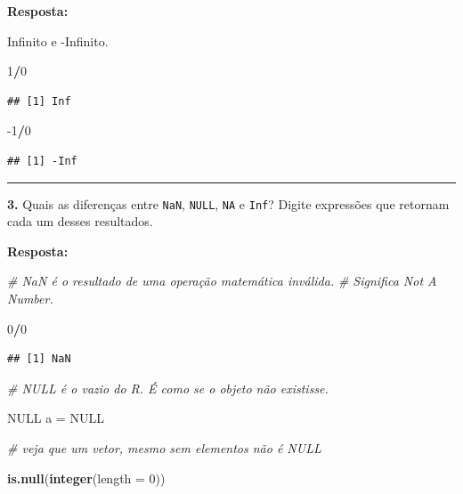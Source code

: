 \documentclass[
]{book}
\newenvironment{Shaded}{\begin{snugshade}}{\end{snugshade}}
\newcommand{\CommentTok}[1]{\textcolor[rgb]{0.56,0.35,0.01}{\textit{#1}}}
\newcommand{\DataTypeTok}[1]{\textcolor[rgb]{0.13,0.29,0.53}{#1}}
\newcommand{\DecValTok}[1]{\textcolor[rgb]{0.00,0.00,0.81}{#1}}
\newcommand{\KeywordTok}[1]{\textcolor[rgb]{0.13,0.29,0.53}{\textbf{#1}}}
\newcommand{\NormalTok}[1]{#1}
\newcommand{\OperatorTok}[1]{\textcolor[rgb]{0.81,0.36,0.00}{\textbf{#1}}}
\newcommand{\OtherTok}[1]{\textcolor[rgb]{0.56,0.35,0.01}{#1}}
\newcommand{\StringTok}[1]{\textcolor[rgb]{0.31,0.60,0.02}{#1}}
\begin{document}
\textbf{Resposta:}

Infinito e -Infinito.

\begin{Shaded}
\begin{Highlighting}[]
\DecValTok{1}\OperatorTok{/}\DecValTok{0}
\end{Highlighting}
\end{Shaded}

\begin{verbatim}
## [1] Inf
\end{verbatim}

\begin{Shaded}
\begin{Highlighting}[]
\DecValTok{{-}1}\OperatorTok{/}\DecValTok{0}
\end{Highlighting}
\end{Shaded}

\begin{verbatim}
## [1] -Inf
\end{verbatim}

\begin{center}\rule{0.5\linewidth}{0.5pt}\end{center}

\textbf{3.} Quais as diferenças entre \texttt{NaN}, \texttt{NULL}, \texttt{NA} e \texttt{Inf}? Digite expressões que retornam cada um desses resultados.

\textbf{Resposta:}

\begin{Shaded}
\begin{Highlighting}[]
\CommentTok{\# NaN é o resultado de uma operação matemática inválida. }
\CommentTok{\# Significa Not A Number.}

\DecValTok{0}\OperatorTok{/}\DecValTok{0}
\end{Highlighting}
\end{Shaded}

\begin{verbatim}
## [1] NaN
\end{verbatim}

\begin{Shaded}
\begin{Highlighting}[]
\CommentTok{\# NULL é o vazio do R. É como se o objeto não existisse.}

\OtherTok{NULL}
\NormalTok{a =}\StringTok{ }\OtherTok{NULL}
\end{Highlighting}
\end{Shaded}

\begin{Shaded}
\begin{Highlighting}[]
\CommentTok{\# veja que um vetor, mesmo sem elementos não é NULL}

\KeywordTok{is.null}\NormalTok{(}\KeywordTok{integer}\NormalTok{(}\DataTypeTok{length =} \DecValTok{0}\NormalTok{)) }
\end{Highlighting}
\end{Shaded}
\end{document}
